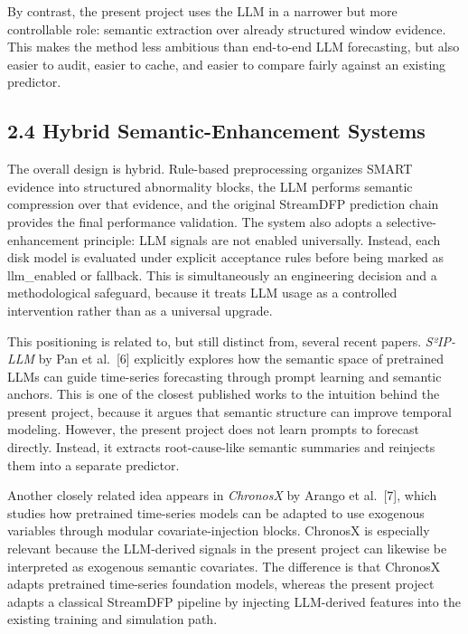 \documentclass[
  11pt,
  a4paper]{article}
\begin{document}
By contrast, the present project uses the LLM in a narrower but more
controllable role: semantic extraction over already structured window
evidence. This makes the method less ambitious than end-to-end LLM
forecasting, but also easier to audit, easier to cache, and easier to
compare fairly against an existing predictor.

\hypertarget{hybrid-semantic-enhancement-systems}{%
\subsection{2.4 Hybrid Semantic-Enhancement
Systems}\label{hybrid-semantic-enhancement-systems}}

The overall design is hybrid. Rule-based preprocessing organizes SMART
evidence into structured abnormality blocks, the LLM performs semantic
compression over that evidence, and the original StreamDFP prediction
chain provides the final performance validation. The system also adopts
a selective-enhancement principle: LLM signals are not enabled
universally. Instead, each disk model is evaluated under explicit
acceptance rules before being marked as llm\_enabled or fallback. This
is simultaneously an engineering decision and a methodological
safeguard, because it treats LLM usage as a controlled intervention
rather than as a universal upgrade.

This positioning is related to, but still distinct from, several recent
papers. \emph{S²IP-LLM} by Pan et al.~{[}6{]} explicitly explores how
the semantic space of pretrained LLMs can guide time-series forecasting
through prompt learning and semantic anchors. This is one of the closest
published works to the intuition behind the present project, because it
argues that semantic structure can improve temporal modeling. However,
the present project does not learn prompts to forecast directly.
Instead, it extracts root-cause-like semantic summaries and reinjects
them into a separate predictor.

Another closely related idea appears in \emph{ChronosX} by Arango et
al.~{[}7{]}, which studies how pretrained time-series models can be
adapted to use exogenous variables through modular covariate-injection
blocks. ChronosX is especially relevant because the LLM-derived signals
in the present project can likewise be interpreted as exogenous semantic
covariates. The difference is that ChronosX adapts pretrained
time-series foundation models, whereas the present project adapts a
classical StreamDFP pipeline by injecting LLM-derived features into the
existing training and simulation path.
\end{document}
